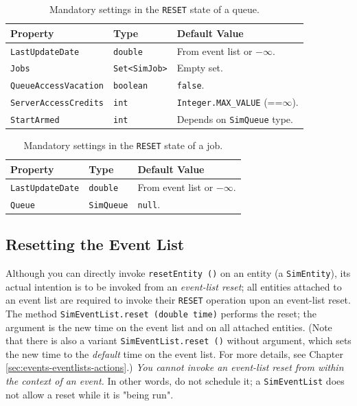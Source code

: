 \documentclass[12pt]{book}
\begin{document}
\begin{table}[h]
\caption{Mandatory settings in the \texttt{RESET} state
  of a queue.}
\label{resetStateSettings-queue}
\begin{center}
\begin{tabular}{|l|l|l|}
\hline
Property & Type & Default Value \\ \hline
\lstinline|LastUpdateDate|      & \lstinline|double|      & From event list or $-\infty$.               \\ \hline
\lstinline|Jobs|                & \lstinline|Set<SimJob>| & Empty set.                                  \\ \hline
\lstinline|QueueAccessVacation| & \lstinline|boolean|     & \lstinline|false|.                          \\ \hline
\lstinline|ServerAccessCredits| & \lstinline|int|         & \lstinline|Integer.MAX_VALUE| (==$\infty$). \\ \hline
\lstinline|StartArmed|          & \lstinline|int|         & Depends on \lstinline|SimQueue| type.       \\ \hline
\end{tabular}
\end{center}
\end{table}

\begin{table}[h]
\caption{Mandatory settings in the \texttt{RESET} state
  of a job.}
\label{resetStateSettings-job}
\begin{center}
\begin{tabular}{|l|l|l|}
\hline
Property & Type & Default Value \\ \hline
\lstinline|LastUpdateDate|      & \lstinline|double|      & From event list or $-\infty$.               \\ \hline
\lstinline|Queue|               & \lstinline|SimQueue|    & \lstinline|null|.                           \\ \hline
\end{tabular}
\end{center}
\end{table}

\subsection{Resetting the Event List}

Although you can directly invoke \lstinline|resetEntity ()| on an entity
  (a \lstinline|SimEntity|),
  its actual intention is to be invoked from an {\em event-list reset\/};
  all entities attached to an event list are required
  to invoke their \lstinline|RESET| operation upon an event-list reset.
The method \lstinline|SimEventList.reset (double time)| performs
  the reset; the argument is the new time on the event list
  and on all attached entities.
(Note that there is also a variant \lstinline|SimEventList.reset ()|
  without argument, which sets the new time to the {\em default\/} time on the
  event list. For more details, see Chapter \ref{sec:events-eventlists-actions}.)
{\em You cannot invoke an event-list reset from within the context of an event.}
In other words, do not schedule it;
  a \lstinline|SimEventList| does not allow a reset
  while it is "being run".
\end{document}
